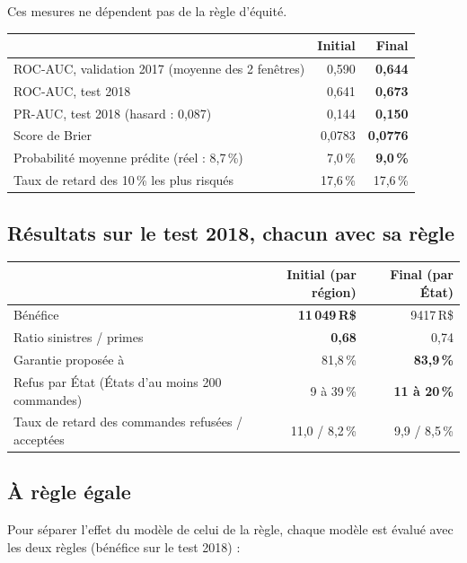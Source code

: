 \documentclass[11pt,a4paper]{article}
\newcommand{\RS}{\,R\$}
\begin{document}
Ces mesures ne dépendent pas de la règle d'équité.

\begin{center}
\begin{tabular}{@{}lrr@{}}
\toprule
& Initial & Final \\
\midrule
ROC-AUC, validation 2017 (moyenne des 2 fenêtres) & 0,590 & \textbf{0,644} \\
ROC-AUC, test 2018 & 0,641 & \textbf{0,673} \\
PR-AUC, test 2018 (hasard : 0,087) & 0,144 & \textbf{0,150} \\
Score de Brier & 0,0783 & \textbf{0,0776} \\
Probabilité moyenne prédite (réel : 8,7\,\%) & 7,0\,\% & \textbf{9,0\,\%} \\
Taux de retard des 10\,\% les plus risqués & 17,6\,\% & 17,6\,\% \\
\bottomrule
\end{tabular}
\end{center}

\subsection*{Résultats sur le test 2018, chacun avec sa règle}

\begin{center}
\begin{tabular}{@{}lrr@{}}
\toprule
& Initial (par région) & Final (par État) \\
\midrule
Bénéfice & \textbf{11\,049\RS{}} & \num{9417}\RS{} \\
Ratio sinistres / primes & \textbf{0,68} & 0,74 \\
Garantie proposée à & 81,8\,\% & \textbf{83,9\,\%} \\
Refus par État (États d'au moins 200 commandes) & 9 à 39\,\% & \textbf{11 à 20\,\%} \\
Taux de retard des commandes refusées / acceptées & 11,0 / 8,2\,\% & 9,9 / 8,5\,\% \\
\bottomrule
\end{tabular}
\end{center}

\subsection*{À règle égale}

Pour séparer l'effet du modèle de celui de la règle, chaque modèle est évalué avec les deux
règles (bénéfice sur le test 2018) :
\end{document}
